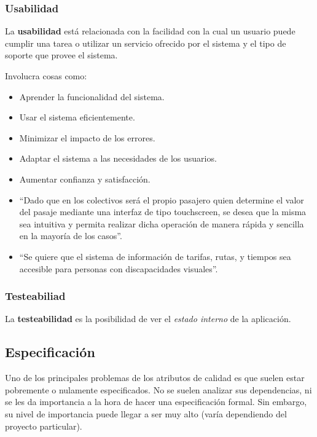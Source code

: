 \documentclass[]{article}
\begin{document}
\subsubsection{Usabilidad}
La \textbf{usabilidad} está relacionada con la facilidad con la cual un usuario puede cumplir una tarea o utilizar un servicio ofrecido por el sistema y el tipo de soporte que provee el sistema.

Involucra cosas como:
\begin{itemize}
	\item Aprender la funcionalidad del sistema.
	\item Usar el sistema eficientemente.
	\item Minimizar el impacto de los errores.
	\item Adaptar el sistema a las necesidades de los usuarios.
	\item Aumentar confianza y satisfacción.
\end{itemize}

\begin{itemize}
	\item ``Dado que en los colectivos será el propio pasajero quien determine el valor del pasaje mediante una interfaz de tipo touchscreen, se desea que la misma sea intuitiva y permita realizar dicha operación de manera rápida y sencilla en la mayoría de los casos''.
	\item ``Se quiere que el sistema de información de tarifas, rutas, y tiempos sea accesible para personas con discapacidades visuales''.
\end{itemize}


\subsubsection{Testeabiliad}
La \textbf{testeabilidad} es la posibilidad de ver el \emph{estado interno} de la aplicación.


\subsection{Especificación}
Uno de los principales problemas de los atributos de calidad es que suelen estar pobremente o nulamente especificados. No se suelen analizar sus dependencias, ni se les da importancia a la hora de hacer una especificación formal. Sin embargo, su nivel de importancia puede llegar a ser muy alto (varía dependiendo del proyecto particular).
\end{document}
